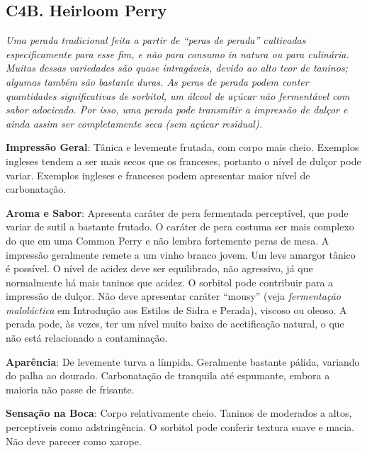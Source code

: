 \subsection*{C4B. Heirloom Perry}

\textit{Uma perada tradicional feita a partir de “peras de perada” cultivadas especificamente para esse fim, e não para consumo \textit{in natura} ou para culinária. Muitas dessas variedades são quase intragáveis, devido ao alto teor de taninos; algumas também são bastante duras. As peras de perada podem conter quantidades significativas de sorbitol, um álcool de açúcar não fermentável com sabor adocicado. Por isso, uma perada pode transmitir a impressão de dulçor e ainda assim ser completamente seca (sem açúcar residual).}

\textbf{Impressão Geral}: Tânica e levemente frutada, com corpo mais cheio. Exemplos ingleses tendem a ser mais secos que os franceses, portanto o nível de dulçor pode variar. Exemplos ingleses e franceses podem apresentar maior nível de carbonatação.

\textbf{Aroma e Sabor}: Apresenta caráter de pera fermentada perceptível, que pode variar de sutil a bastante frutado. O caráter de pera costuma ser mais complexo do que em uma Common Perry e não lembra fortemente peras de mesa. A impressão geralmente remete a um vinho branco jovem. Um leve amargor tânico é possível. O nível de acidez deve ser equilibrado, não agressivo, já que normalmente há mais taninos que acidez. O sorbitol pode contribuir para a impressão de dulçor. Não deve apresentar caráter “mousy” (veja \textit{fermentação maloláctica} em Introdução aos Estilos de Sidra e Perada), viscoso ou oleoso. A perada pode, às vezes, ter um nível muito baixo de acetificação natural, o que não está relacionado a contaminação.

\textbf{Aparência}: De levemente turva a límpida. Geralmente bastante pálida, variando do palha ao dourado. Carbonatação de tranquila até espumante, embora a maioria não passe de frisante.

\textbf{Sensação na Boca}: Corpo relativamente cheio. Taninos de moderados a altos, perceptíveis como adstringência. O sorbitol pode conferir textura suave e macia. Não deve parecer como xarope.

